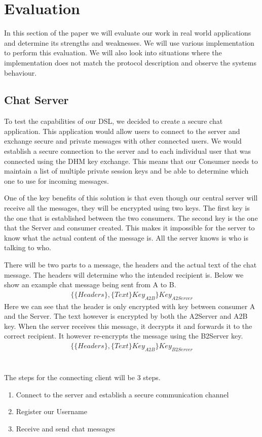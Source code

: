 \section{Evaluation}
In this section of the paper we will evaluate our work in real world applications and determine its strengths and weaknesses. We will use various implementation to perform this evaluation. We will also look into situations where the implementation does not match the protocol description and observe the systems behaviour.

\subsection{Chat Server}
To test the capabilities of our DSL, we decided to create a secure chat application. This application would allow  users to connect to the server and exchange secure and private messages with other connected users. We would establish a secure connection to the server and to each individual user that was connected using the DHM key exchange. This means that our Consumer needs to maintain a list of multiple private session keys and be able to determine which one to use for incoming messages.

One of the key benefits of this solution is that even though our central server will receive all the messages, they will be encrypted using two keys. The first key is the one that is established between the two consumers. The second key is the one that the Server and consumer created. This makes it impossible for the server to know what the actual content of the message is. All the server knows is who is talking to who. 

There will be two parts to a message, the headers and the actual text of the chat message. The headers will determine who the intended recipient is. Below we show an example chat message being sent from A to B.
$$
 \begin{multlined}
  \{\{Headers\}, \{Text\}Key_{A2B}\}Key_{A2Server}
 \end{multlined}
$$
Here we can see that the header is only encrypted with key between consumer A and the Server. The text however is encrypted by both the A2Server and A2B key. When the server receives this message, it decrypts it and forwards it to the correct recipient. It however re-encrypts the message using the B2Server key.
$$
 \begin{multlined}
  \{\{Headers\}, \{Text\}Key_{A2B}\}Key_{B2Server}
 \end{multlined}
$$
\\\\
The steps for the connecting client will be 3 steps. 
\begin{enumerate}
 \item Connect to the server and establish a secure communication channel
 \item Register our Username
 \item Receive and send chat messages
\end{enumerate}

